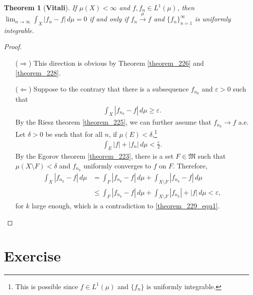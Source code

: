 \documentclass[11pt]{book}
\newtheorem{theorem}{Theorem}[chapter]
\theoremstyle{definition}
\numberwithin{equation}{chapter}
\begin{document}
\begin{theorem}[{\bf Vitali}]
If $\mu(X) < \infty$ and $f,f_n \in L^1(\mu)$, then $\lim_{n\to\infty}\int_X \left|f_n - f\right|\,d\mu = 0$ if and only if $f_n \xrightarrow[]{\mu} f$ and $\{f_n\}^\infty_{n=1}$ is uniformly integrable.
\end{theorem}
\begin{proof}
~\begin{enumerate}
    \item[($\Rightarrow$)] This direction is obvious by Theorem \ref{theorem_226} and  \ref{theorem_228}.
    
    \item[($\Leftarrow$)] Suppose to the contrary that there is a subsequence $f_{n_k}$ and $\varepsilon > 0$ such that
    \begin{align}\label{theorem_229_equ1}
        \int_X \left|f_{n_k} - f\right|\,d\mu \geq \varepsilon.
    \end{align}
    By the Riesz theorem \ref{theorem_225}, we can further assume that $f_{n_k} \to f$ a.e. Let $\delta > 0$ be such that for all $n$, if $\mu(E) < \delta$,\footnote{This is possible since $f \in L^1(\mu)$ and $\{f_n\}$ is uniformly integrable.}
    \begin{align*}
        \int_E \left|f\right| + \left|f_n\right| \, d\mu < \frac{\varepsilon}{2}.
    \end{align*}
    By the Egorov theorem \ref{theorem_223}, there is a set $F \in \mathfrak{M}$ such that $\mu(X \setminus F) < \delta$ and $f_{n_k}$ uniformly converges to $f$ on $F$. Therefore, 
    \begin{align*}
        \int_X \left|f_{n_k} - f\right|\,d\mu & = \int_F \left|f_{n_k} - f\right|\,d\mu + \int_{X \setminus F} \left|f_{n_k} - f\right|\,d\mu \\
        & \leq \int_F \left|f_{n_k} - f\right|\,d\mu + \int_{X \setminus F} \left|f_{n_k}\right| + \left|f\right|\,d\mu < \varepsilon,
    \end{align*}
    for $k$ large enough, which is a contradiction to \eqref{theorem_229_equ1}. 
\end{enumerate}
\end{proof}



\medskip


\section{Exercise}
\end{document}
